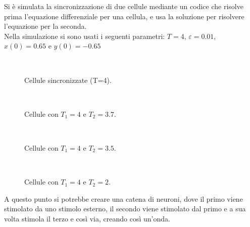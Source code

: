 \documentclass[12pt]{article}
\begin{document}
Si è simulata la sincronizzazione di due cellule mediante un codice che risolve prima l'equazione differenziale per una cellula, e usa la soluzione per risolvere l'equazione per la seconda. \\
Nella simulazione si sono usati i seguenti parametri: $T=4$, $\varepsilon=0.01$, $x(0) = 0.65$ e $y(0) = -0.65$ 
\begin{figure}[H]
\ \ \ \ 
\begin{minipage}[b]{0.4\textwidth}
	\centering
	\scalebox{0.7}{}
	\caption{Cellule sincronizzate (T=4).}
\end{minipage}
\ \ \ \ \ \ \ \ \ \ 
\begin{minipage}[b]{0.4\textwidth}
	\centering
	\scalebox{0.7}{}
	\caption{Cellule con $T_1 = 4$ e $T_2 = 3.7$.}
\end{minipage}
\end{figure}
\begin{figure}[H]
	\ \ \ \ 
	\begin{minipage}[b]{0.4\textwidth}
		\centering
		\scalebox{0.7}{}
		\caption{Cellule con $T_1 = 4$ e $T_2 = 3.5$.}
	\end{minipage}
	\ \ \ \ \ \ \ \ \ \ 
	\begin{minipage}[b]{0.4\textwidth}
		\centering
		\scalebox{0.7}{}
		\caption{Cellule con $T_1 = 4$ e $T_2 = 2$.}
	\end{minipage}
\end{figure}
A questo punto si potrebbe creare una catena di neuroni, dove il primo viene stimolato da uno stimolo esterno, il secondo viene stimolato dal primo e a sua volta stimola il terzo e così via, creando così un'onda.
\end{document}

